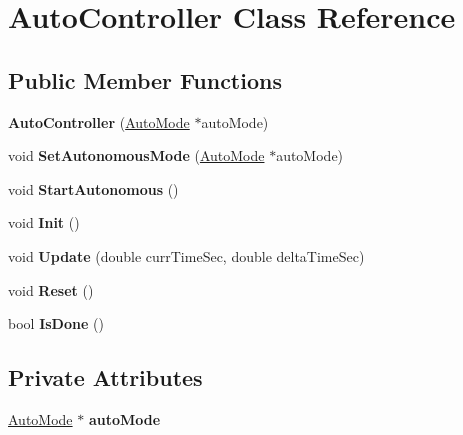 \hypertarget{class_auto_controller}{}\section{Auto\+Controller Class Reference}
\label{class_auto_controller}
\subsection*{Public Member Functions}
\begin{DoxyCompactItemize}
\item 
\mbox{\label{class_auto_controller_a8fddf9163735e6fc44572e9f59116084}} 
{\bfseries Auto\+Controller} (\hyperlink{class_auto_mode}{Auto\+Mode} $\ast$auto\+Mode)
\item 
\mbox{\label{class_auto_controller_a8bb1c3117bf7e528c73e4d3edd49d0ba}} 
void {\bfseries Set\+Autonomous\+Mode} (\hyperlink{class_auto_mode}{Auto\+Mode} $\ast$auto\+Mode)
\item 
\mbox{\label{class_auto_controller_a86c89bedf59d9746d729dead3368460f}} 
void {\bfseries Start\+Autonomous} ()
\item 
\mbox{\label{class_auto_controller_a8b7b16e449078e1818b4bc302f97da07}} 
void {\bfseries Init} ()
\item 
\mbox{\label{class_auto_controller_a733fa15c9d374adcb458b0d6f0890910}} 
void {\bfseries Update} (double curr\+Time\+Sec, double delta\+Time\+Sec)
\item 
\mbox{\label{class_auto_controller_a58a880e7fdce5953714c3a1d70f49eac}} 
void {\bfseries Reset} ()
\item 
\mbox{\label{class_auto_controller_a692f9395f78cb214ed7c410505686334}} 
bool {\bfseries Is\+Done} ()
\end{DoxyCompactItemize}
\subsection*{Private Attributes}
\begin{DoxyCompactItemize}
\item 
\mbox{\label{class_auto_controller_a85f5b014c905fe3ac77e3024ad1ebe56}} 
\hyperlink{class_auto_mode}{Auto\+Mode} $\ast$ {\bfseries auto\+Mode}
\end{DoxyCompactItemize}


